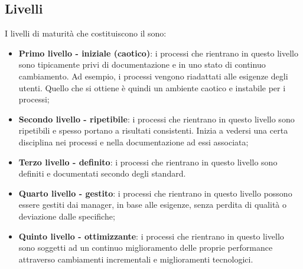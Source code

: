 \documentclass[PianoDiQualifica.tex]{subfiles}
\begin{document}
	\subsection{Livelli}
	I livelli di maturità che costituiscono il  sono:
	\begin{itemize}
		\item \textbf{Primo livello - iniziale (caotico)}: i processi che rientrano in questo livello sono tipicamente privi di documentazione e in uno stato di
		continuo cambiamento. Ad esempio, i processi vengono riadattati alle esigenze degli utenti. Quello che si ottiene è quindi un
		ambiente caotico e instabile per i processi;
		\item \textbf{Secondo livello - ripetibile}:  i processi che rientrano in questo livello sono ripetibili e spesso portano a risultati consistenti.
		Inizia a vedersi una certa disciplina nei processi e nella documentazione ad essi associata;
		\item \textbf{Terzo livello - definito}: i processi che rientrano in questo livello sono definiti e documentati secondo degli standard.
		\item \textbf{Quarto livello - gestito}: i processi che rientrano in questo livello possono essere gestiti dai manager, in base alle esigenze, senza
		perdita di qualità o deviazione dalle specifiche;
		\item \textbf{Quinto livello - ottimizzante}: i processi che rientrano in questo livello sono soggetti ad un continuo miglioramento delle proprie
		performance attraverso cambiamenti incrementali e miglioramenti tecnologici.
	\end{itemize}
\end{document}
